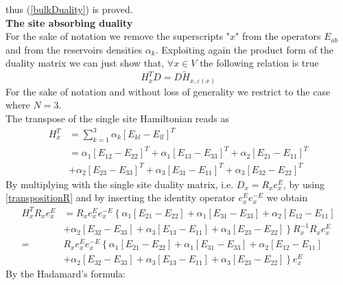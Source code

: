 \documentclass[11pt]{article}
\numberwithin{equation}{section}
\begin{document}
thus (\ref{bulkDuality}) is proved.\\
\textbf{The site absorbing duality}\\
For the sake of notation we remove the superscripts "$x$" from the operators $E_{ab}$ and from the reservoirs densities $\alpha_{k}$. Exploiting again the product form of the duality matrix we can just show that, $\forall x\in V$ the following relation is true 
\begin{equation}\label{boundaryDuality}
    	H_{x}^{T}D=D\widetilde{H}_{x,\varepsilon(x)}
\end{equation}
For the sake of notation and without loss of generality we restrict to the case where $N=3$. \\
The transpose of the single site Hamiltonian reads as
\begin{equation}
	\begin{split}
	H_{x}^{T}&=\sum_{k=1}^{3}\alpha_{k}\left[E_{kl}-E_{ll}\right]^{T}\\&=
	\alpha_{1}\left[E_{12}-E_{22}\right]^{T}+\alpha_{1}\left[E_{13}-E_{33}\right]^{T}+\alpha_{2}\left[E_{21}-E_{11}\right]^{T}\\&+\alpha_{2}\left[E_{23}-E_{33}\right]^{T}+
	\alpha_{3}\left[E_{31}-E_{11}\right]^{T}+\alpha_{3}\left[E_{32}-E_{22}\right]^{T}
	\end{split}
\end{equation}
By multiplying with the single site duality matrix, i.e. $D_{x}=R_{x}e^{E}_{x}$, by using \eqref{transpositionR} and by inserting the identity operator $e^{E}_{x}e^{-E}_{x}$ we obtain 
\begin{equation}\label{transposeRBoundary}
	\begin{split}
	H^{T}_{x}R_{x}e_{x}^{E}&=R_{x}e_{x}^{E}e_{x}^{-E}\left\{\alpha_{1}\left[E_{21}-E_{22}\right]+\alpha_{1}\left[E_{31}-E_{33}\right]+\alpha_{2}\left[E_{12}-E_{11}\right]\right.\\&+\left.\alpha_{2}\left[E_{32}-E_{33}\right]+
	\alpha_{3}\left[E_{13}-E_{11}\right]+\alpha_{3}\left[E_{23}-E_{22}\right]\right\}R^{-1}_{x}R_{x}e^{E}_{x}\\=&
	R_{x}e_{x}^{E}e_{x}^{-E}\left\{\alpha_{1}\left[E_{21}-E_{22}\right]+\alpha_{1}\left[E_{31}-E_{33}\right]+\alpha_{2}\left[E_{12}-E_{11}\right]\right.\\&+\left.\alpha_{2}\left[E_{32}-E_{33}\right]+
	\alpha_{3}\left[E_{13}-E_{11}\right]+\alpha_{3}\left[E_{23}-E_{22}\right]\right\}e^{E}_{x}
	\end{split}
\end{equation}
By the Hadamard's formula:
\end{document}
